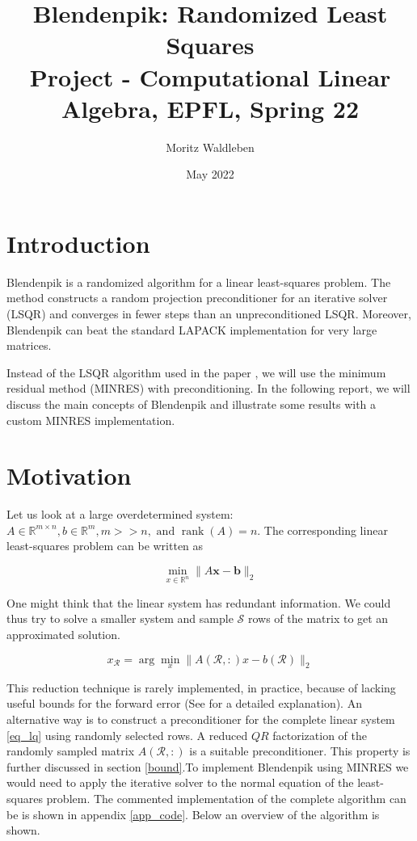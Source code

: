 \documentclass{article}
\title{Blendenpik: Randomized Least Squares \\[1ex] \large Project - Computational Linear Algebra, EPFL, Spring 22}
\author{Moritz Waldleben}
\date{May 2022}
\begin{document}
\maketitle

\section{Introduction} \label{intro}
Blendenpik \cite{blendenpik} is a randomized algorithm for a linear
least-squares problem. The method constructs a random projection preconditioner
for an iterative solver (LSQR) and converges in fewer steps than an
unpreconditioned LSQR. Moreover, Blendenpik can beat the standard LAPACK
implementation for very large matrices. 

Instead of the LSQR algorithm used in the paper \cite{blendenpik}, we will use
the minimum residual method (MINRES) with preconditioning. In the following
report, we will discuss the main concepts of Blendenpik and illustrate some
results with a custom MINRES implementation.

\section{Motivation} \label{mot}
Let us look at a large overdetermined system: $A \in \mathbb{R}^{m \times n}, b
\in \mathbb{R}^{m}, m>>n, \text { and } \operatorname{rank}(A)=n$. The
corresponding linear least-squares problem can be written as

\begin{equation} \label{eq_lq}
\min _{x \in \mathbb{R}^{n}}\|A \mathbf{x}-\mathbf{b}\|_{2}
\end{equation}

One might think that the linear system has redundant information. We could thus
try to solve a smaller system and sample $\mathcal{S}$ rows of the matrix to
get an approximated solution.

\begin{equation} \label{eq_lq_red}
x_{\mathcal{R}}=\arg \min _{x}\|A(\mathcal{R},:) x-b(\mathcal{R})\|_{2}
\end{equation}

This reduction technique is rarely implemented, in practice, because of lacking
useful bounds for the forward error (See \cite{blendenpik} for a detailed
explanation). An alternative way is to construct a preconditioner for the
complete linear system \ref{eq_lq} using randomly selected rows. A reduced
$QR$ factorization of the randomly sampled matrix $A(\mathcal{R},:)$ is a
suitable preconditioner. This property is further discussed in section
\ref{bound}.To implement Blendenpik using MINRES we would need to apply the
iterative solver to the normal equation of the least-squares problem. The
commented implementation of the complete algorithm can be is shown in appendix
\ref{app_code}. Below an overview of the algorithm is shown.
\end{document}
